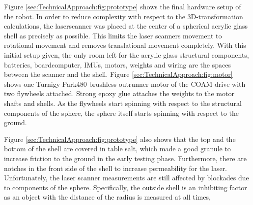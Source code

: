 Figure \ref{sec:TechnicalApproach:fig:prototype} shows the final hardware setup of the robot.
In order to reduce complexity with respect to the 3D-transformation calculations, the laserscanner was placed at the center of a spherical acrylic glass shell as precisely as possible.
This limits the laser scanners movement to rotational movement and removes translational movement completely. With this initial setup given, the only room left for the acrylic glass structural components, batteries, boardcomputer, IMUs, motors, weights and wiring are the spaces between the scanner and the shell.
Figure \ref{sec:TechnicalApproach:fig:motor} shows one Turnigy Park480 brushless outrunner motor \cite{turnigymotor} of the COAM drive with two flywheels attached.
Strong epoxy glue attaches the weights to the motor shafts and shells.
As the flywheels start spinning with respect to the structural components of the sphere, the sphere itself starts spinning with respect to the ground. 

Figure \ref{sec:TechnicalApproach:fig:prototype} also shows that the top and the bottom of the shell are covered in table salt, which made a good granule to increase friction to the ground in the early testing phase. Furthermore, there are notches in the front side of the shell to increase permeability for the laser.
Unfortunately, the laser scanner measurements are still affected by blockades due to components of the sphere.
Specifically, the outside shell is an inhibiting factor as an object with the distance of the radius is measured at all times, 
                                                                                                                                                                                                                  
